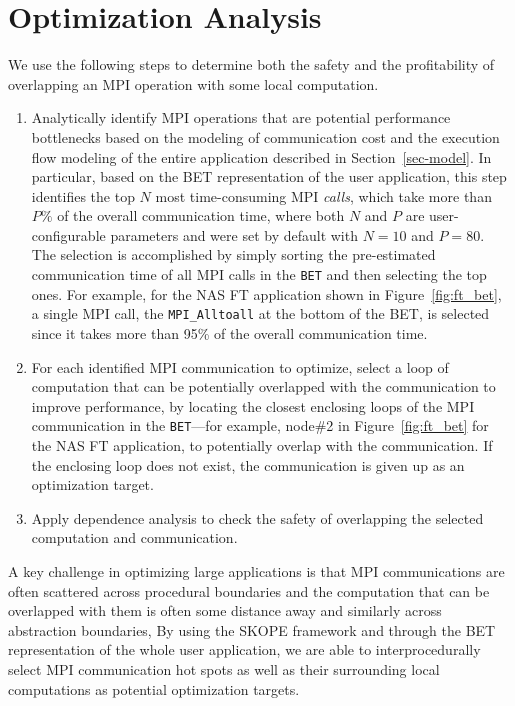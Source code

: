 \section{Optimization Analysis}
\label {sec-analysis}

We use the following steps to determine both the safety and the
profitability of overlapping an MPI operation with some local
computation.

\begin{enumerate}

\item Analytically identify MPI operations that are potential
  performance bottlenecks based on the modeling of communication cost
  and the execution flow modeling of the entire application described
  in Section~\ref{sec-model}.  In particular, based on the BET
  representation of the user application, this step identifies the top
  $N$ most time-consuming MPI \emph{calls}, which take more than $P\%$
  of the overall communication time, where both $N$ and $P$ are
  user-configurable parameters and were set by default with $N=10$ and
  $P=80$.  The selection is accomplished by simply sorting the
  pre-estimated communication time of all MPI calls in the
  \texttt{BET} and then selecting the top ones.  For example, for the
  NAS FT application shown in Figure~\ref{fig:ft_bet}, a single MPI
  call, the \texttt{MPI\_Alltoall} at the bottom of the BET, is
  selected since it takes more than 95\% of the overall communication
  time.

\item For each identified MPI communication to optimize, select a loop
  of computation that can be potentially overlapped with the
  communication to improve performance, by locating the closest
  enclosing loops of the MPI communication in the \texttt{BET}---for
  example, node\#2 in Figure~\ref{fig:ft_bet} for the NAS FT
  application, to potentially overlap with the communication.  If the
  enclosing loop does not exist, the communication is given up as an
  optimization target.

\item Apply dependence analysis to check the safety of overlapping the
  selected computation and communication.

\end{enumerate}

A key challenge in optimizing large applications is that MPI
communications are often scattered across procedural boundaries and
the computation that can be overlapped with them is often some
distance away and similarly across abstraction boundaries, By using
the SKOPE framework and through the BET representation of the whole
user application, we are able to interprocedurally select MPI
communication hot spots as well as their surrounding local
computations as potential optimization targets.

